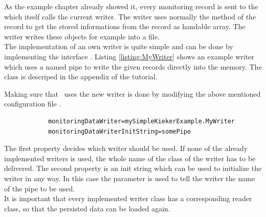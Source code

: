		As the example chapter already showed it, every monitoring record is sent to the  which itself calls the current writer. The writer uses normally the  method of the record to get the stored informations from the record as handable array. The writer writes these objects for example into a file.\\
		The implementation of an own writer is quite simple and can be done by implementing the interface . Listing \ref{listing:MyWriter} shows an example writer which uses a named pipe to write the given records directly into the memory. The class  is descriped in the appendix of the tutorial. 

		\setJavaCodeListing
		

		Making sure that \Kieker\  uses the new writer is done by modifying the above mentioned configuration file \dir{\monitoringPropertiesFile}.

		\setBashListing       
		\begin{lstlisting}
			monitoringDataWriter=mySimpleKiekerExample.MyWriter
			monitoringDataWriterInitString=somePipe
		\end{lstlisting}

		The first property decides which writer should be used. If none of the already implemented writers is used, the whole name of the class of the writer has to be delivered. The second property is an init string which can be used to initialize the writer in any way. In this case the parameter is used to tell the writer the name of the pipe to be used.\\
		\warning It is important that every implemented writer class has a corresponding reader class, so that the persisted data can be loaded again.